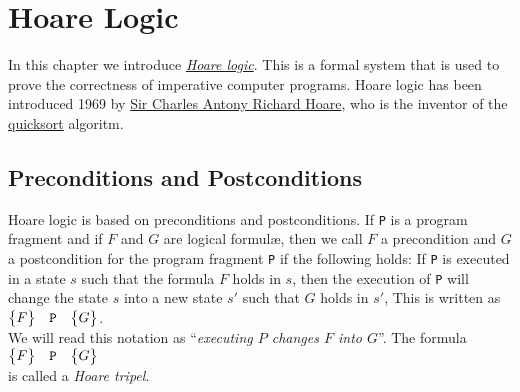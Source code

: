 \chapter{Hoare Logic}
In this chapter we introduce \href{http://en.wikipedia.org/wiki/Hoare_logic}{\emph{Hoare logic}}.
This is a formal system that is used to prove the correctness of imperative computer programs.  
Hoare logic has been introduced 1969 by  
\href{http://en.wikipedia.org/wiki/C._A._R._Hoare}{Sir Charles Antony Richard Hoare}, 
who is the inventor of the \href{http://en.wikipedia.org/wiki/Quicksort}{quicksort} algoritm.
 

\section{Preconditions and Postconditions}
Hoare logic is based on preconditions and postconditions.  If \texttt{P}
 is a program fragment and if $F$ and $G$ are logical formul\ae, then we call
$F$ a precondition and $G$ a postcondition for the program fragment \texttt{P}
if the following holds:  If \texttt{P} is executed in a state $s$ such that the formula $F$ holds in
$s$, then the execution of \texttt{P} will change the state $s$ into a new state $s'$ such that 
$G$ holds in $s'$,  This is written as
\\[0.2cm]
\hspace*{1.3cm}
$ \bigl\{F\bigr\}\quad\texttt{P}\quad\bigl\{G\bigr\} $.
\\[0.2cm]
We will read this notation as ``\emph{executing $P$ changes $F$ into $G$}''.
The formula
\\[0.2cm]
\hspace*{1.3cm}
$ \bigl\{F\bigr\}\quad\texttt{P}\quad\bigl\{G\bigr\} $
\\[0.2cm]
is called a \emph{Hoare tripel}.
\vspace*{0.3cm}


